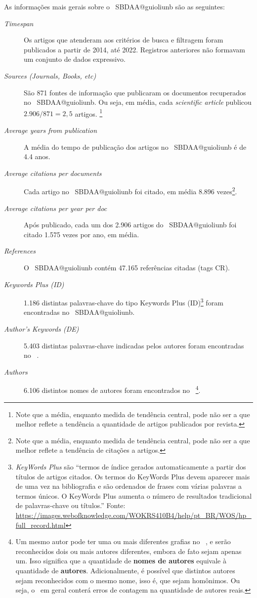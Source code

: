 As informações mais gerais sobre o \dataset\   SBDAA@guioliunb são as seguintes:
\begin{description}
    \item [\textit{Timespan}] Os artigos que atenderam aos critérios de busca e filtragem foram publicados a partir de 2014, até 2022. Registros anteriores não formavam um conjunto de dados expressivo.
    \item [\textit{Sources (Journals, Books, etc)}] São 871 fontes de informação que publicaram os documentos recuperados no \dataset\   SBDAA@guioliunb. Ou seja, em média, cada \textit{scientific article} publicou $2.906/871=2,5$ artigos. \footnote{Note que a média, enquanto medida de tendência central, pode não ser a que melhor reflete a tendência a quantidade de artigos publicados por revista.}
    \item [\textit{Average years from publication}] A média do tempo de publicação dos artigos no \dataset\   SBDAA@guioliunb é de 4.4 anos.
    \item [\textit{Average citations per documents}] Cada artigo no \dataset\   SBDAA@guioliunb foi citado, em média 8.896 vezes\footnote{Note que a média, enquanto medida de tendência central, pode não ser a que melhor reflete a tendência de  citações a artigos.}.
    \item [\textit{Average citations per year per doc}] Após publicado, cada um dos 2.906 artigos do \dataset\   SBDAA@guioliunb  foi citado 1.575 vezes por ano, em média.
    \item [\textit{References}] O \dataset\   SBDAA@guioliunb contém 47.165 referências citadas (tags CR).
    \item [\textit{Keywords Plus (ID)}] 1.186 distintas palavras-chave do tipo Keywords Plus (ID)\footnote{\textit{KeyWords Plus} são ``termos de índice gerados automaticamente a partir dos títulos de artigos citados. Os termos do KeyWords Plus devem aparecer mais de uma vez na bibliografia e são ordenados de frases com várias palavras a termos únicos. O KeyWords Plus aumenta o número de resultados tradicional de palavras-chave ou títulos.'' Fonte: \url{https://images.webofknowledge.com/WOKRS410B4/help/pt_BR/WOS/hp_full_record.html}} foram encontradas no \dataset\   SBDAA@guioliunb. 
    \item [\textit{Author's Keywords (DE)}] 5.403 distintas palavras-chave indicadas pelos autores foram encontradas no \dataset\  .
    \item [\textit{Authors}] 6.106 distintos nomes de autores foram encontrados no \dataset\  \footnote{Um mesmo autor pode ter uma ou mais diferentes grafias no \dataset\  , e serão reconhecidos dois ou mais autores diferentes, embora de fato sejam apenas um. Isso significa que a quantidade de \textbf{nomes de autores} equivale à quantidade de \textbf{autores}. Adicionalmente, é possível que distintos autores sejam reconhecidos com o mesmo nome, isso é, que sejam homônimos. Ou seja, o \dataset\   em geral conterá erros de contagem na quantidade de autores reais.}.

\end{description}
